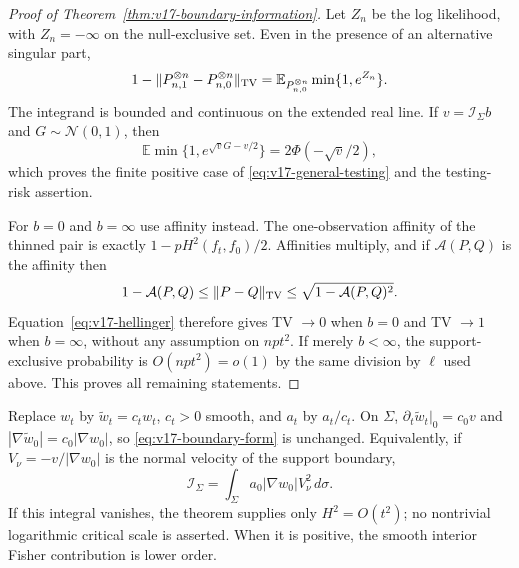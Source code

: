 \begin{proof}[Proof of Theorem~\ref{thm:v17-boundary-information}]
Let $Z_n$ be the log likelihood, with $Z_n=-\infty$ on the null-exclusive
set.  Even in the presence of an alternative singular part,
\[
 1-\|P_{n,1}^{\otimes n}-P_{n,0}^{\otimes n}\|_{\rm TV}
 =\mathbb E_{P_{n,0}^{\otimes n}}\min\{1,e^{Z_n}\}.
\]
The integrand is bounded and continuous on the extended real line.  If
$v=\mathcal I_\Sigma b$ and $G\sim\mathcal N(0,1)$, then
\[
 \mathbb E\min\{1,e^{\sqrt vG-v/2}\}=2\Phi(-\sqrt v/2),
\]
which proves the finite positive case of
\eqref{eq:v17-general-testing} and the testing-risk assertion.

For $b=0$ and $b=\infty$ use affinity instead.  The one-observation
affinity of the thinned pair is exactly
$1-pH^2(f_t,f_0)/2$.  Affinities multiply, and if $\mathcal A(P,Q)$ is
the affinity then
\[
 1-\mathcal A(P,Q)\le\|P-Q\|_{\rm TV}
 \le\sqrt{1-\mathcal A(P,Q)^2}.
\]
Equation~\eqref{eq:v17-hellinger} therefore gives TV $\to0$ when $b=0$
and TV $\to1$ when $b=\infty$, without any assumption on
$npt^2$.  If merely $b<\infty$, the support-exclusive probability is
$O(npt^2)=o(1)$ by the same division by $\ell$ used above.  This proves all
remaining statements.
\end{proof}

\begin{remark}\label{rem:v17-invariance}
Replace $w_t$ by $\widetilde w_t=c_tw_t$, $c_t>0$ smooth, and $a_t$ by
$a_t/c_t$.  On $\Sigma$,
$\partial_t\widetilde w_t|_0=c_0v$ and
$|\nabla\widetilde w_0|=c_0|\nabla w_0|$, so
\eqref{eq:v17-boundary-form} is unchanged.  Equivalently, if
$V_\nu=-v/|\nabla w_0|$ is the normal velocity of the support boundary,
\[
 \mathcal I_\Sigma=
 \int_\Sigma a_0|\nabla w_0|V_\nu^2\,d\sigma.
\]
If this integral vanishes, the theorem supplies only $H^2=O(t^2)$; no
nontrivial logarithmic critical scale is asserted.  When it is positive,
the smooth interior Fisher contribution is lower order.
\end{remark}
